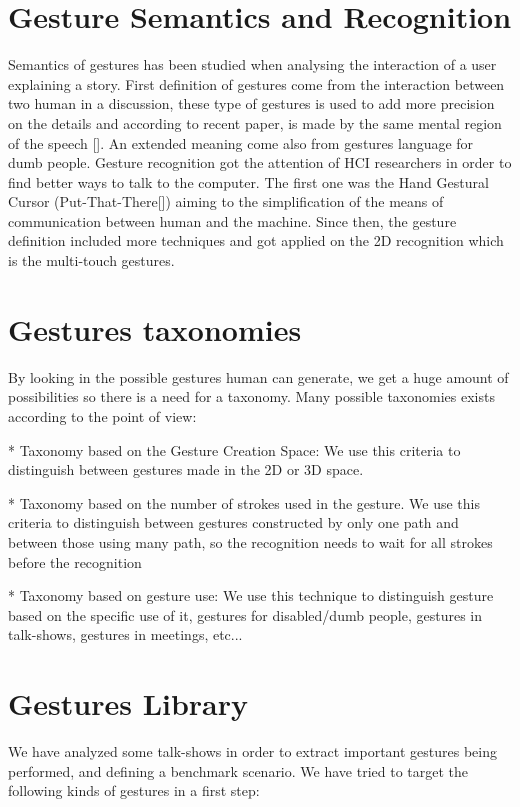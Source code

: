 \documentclass{llncs}
\begin{document}
\section{Gesture Semantics and Recognition}
Semantics of gestures has been studied when analysing the interaction of a user explaining a story. 
First definition of gestures come from the interaction between two human in a discussion, these type of gestures is used to add more precision on the details and according to recent paper, is made by the same mental region of the speech []. An extended meaning come also from gestures language for dumb people.
Gesture recognition got the attention of HCI researchers in order to find better ways to talk to the computer. The first one was the Hand Gestural Cursor (Put-That-There[]) aiming to the simplification of the means of communication between human and the machine.
Since then, the gesture definition included more techniques and got applied on the 2D recognition which is the multi-touch gestures.


\section{Gestures taxonomies}
By looking in the possible gestures human can generate, we get a huge amount of possibilities so there is a need for a taxonomy. Many possible taxonomies exists according to the point of view:

* Taxonomy based on the Gesture Creation Space:
We use this criteria to distinguish between gestures made in the 2D or 3D space.

* Taxonomy based on the number of strokes used in the gesture.
We use this criteria to distinguish between gestures constructed by only one path and between those using many path, so the recognition needs to wait for all strokes before the recognition

* Taxonomy based on gesture use:
We use this technique to distinguish gesture based on the specific use of it, gestures for disabled/dumb people, gestures in talk-shows, gestures in meetings, etc...

\section{Gestures Library}
We have analyzed some talk-shows in order to extract important gestures being performed, and defining a benchmark scenario. 
We have tried to target the following kinds of gestures in a first step:
\end{document}
